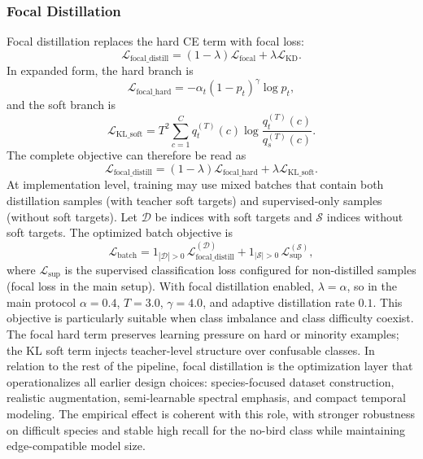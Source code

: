 \documentclass[a4paper,singleside,12pt]{report} %
\begin{document}
	\subsubsection{Focal Distillation}
	Focal distillation replaces the hard CE term with focal loss:
	\begin{equation}
		\mathcal{L}_{\mathrm{focal\_distill}} = (1-\lambda)\mathcal{L}_{\mathrm{focal}} + \lambda \mathcal{L}_{\mathrm{KD}}.
	\end{equation}
	In expanded form, the hard branch is
	\begin{equation}
		\mathcal{L}_{\mathrm{focal\_hard}} = -\alpha_t(1-p_t)^\gamma \log p_t,
	\end{equation}
	and the soft branch is
	\begin{equation}
		\mathcal{L}_{\mathrm{KL\_soft}} = T^2\sum_{c=1}^{C} q_t^{(T)}(c)\log\frac{q_t^{(T)}(c)}{q_s^{(T)}(c)}.
	\end{equation}
	The complete objective can therefore be read as
	\begin{equation}
		\mathcal{L}_{\mathrm{focal\_distill}} = (1-\lambda)\mathcal{L}_{\mathrm{focal\_hard}} + \lambda\mathcal{L}_{\mathrm{KL\_soft}}.
	\end{equation}
	At implementation level, training may use mixed batches that contain both distillation samples (with teacher soft targets) and supervised-only samples (without soft targets). Let \(\mathcal{D}\) be indices with soft targets and \(\mathcal{S}\) indices without soft targets. The optimized batch objective is
	\begin{equation}
		\mathcal{L}_{\mathrm{batch}}
		= 1_{|\mathcal{D}|>0}\,\mathcal{L}_{\mathrm{focal\_distill}}^{(\mathcal{D})}
		+ 1_{|\mathcal{S}|>0}\,\mathcal{L}_{\mathrm{sup}}^{(\mathcal{S})},
	\end{equation}
	where \(\mathcal{L}_{\mathrm{sup}}\) is the supervised classification loss configured for non-distilled samples (focal loss in the main setup). With focal distillation enabled, \(\lambda=\alpha\), so in the main protocol \(\alpha=0.4\), \(T=3.0\), \(\gamma=4.0\), and adaptive distillation rate \(0.1\).
	This objective is particularly suitable when class imbalance and class difficulty coexist. The focal hard term preserves learning pressure on hard or minority examples; the KL soft term injects teacher-level structure over confusable classes. In relation to the rest of the pipeline, focal distillation is the optimization layer that operationalizes all earlier design choices: species-focused dataset construction, realistic augmentation, semi-learnable spectral emphasis, and compact temporal modeling. The empirical effect is coherent with this role, with stronger robustness on difficult species and stable high recall for the no-bird class while maintaining edge-compatible model size.
\end{document}
